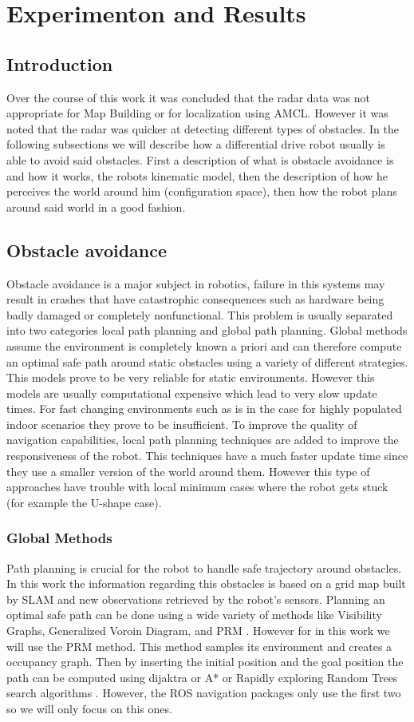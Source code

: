 \chapter{Experimenton and Results}


\section{Introduction}
Over the course of this work it was concluded that the radar data was not appropriate for Map Building or for localization using \ac{AMCL}. However it was noted that the radar was quicker   at detecting different types of obstacles. In the following subsections we will describe how a differential drive robot usually is able to avoid  said obstacles. 
First a description of what is obstacle avoidance is and how it  works, the robots kinematic model, then the description of how he perceives the world around him (configuration space), then how the robot plans around said world in a good fashion.
\section{Obstacle avoidance}
 Obstacle avoidance is a major subject in robotics, failure in this systems may result in crashes that have catastrophic consequences such as hardware being badly damaged or completely nonfunctional. This problem is usually separated into two categories local path planning and global path planning. 
 Global methods assume the environment is completely known a priori and can therefore compute an optimal safe path  around static obstacles using a variety of different strategies. This models prove to be very reliable for static environments. However this models are usually computational expensive which lead to very slow update times. For fast changing environments such as is in the case for highly populated indoor scenarios they prove to be insufficient. 
 To improve the quality of navigation capabilities, local path planning techniques are added to improve the responsiveness of the robot. This techniques have a much faster update time  since they use a smaller version of the world around them. However this type of approaches have trouble with local minimum cases where the robot gets stuck (for example the U-shape case).
\subsection{Global Methods}
Path planning is crucial for the robot to handle safe trajectory around obstacles. In this work the information regarding this obstacles is based on a grid map built by \ac{SLAM} and new observations retrieved by the robot's sensors.  Planning an optimal safe path can be done using a wide variety of methods like Visibility Graphs, Generalized Voroin Diagram, and \ac{PRM} \cite{globalmethods}. However for in this work we will use the \ac{PRM} method. This method samples its environment and creates a occupancy graph. Then by inserting the initial position and the goal position the path can be computed using dijaktra or A* or Rapidly exploring Random Trees search algorithms . However, the \ac{ROS} navigation packages only use the first two so  we will only focus on this ones.


